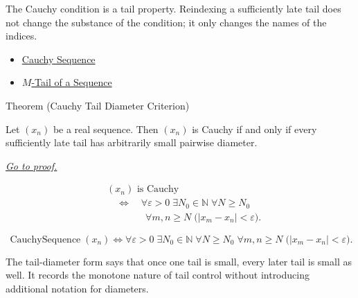 \begin{remark*}[Interpretation]
The Cauchy condition is a tail property. Reindexing a sufficiently late tail
does not change the substance of the condition; it only changes the names of
the indices.
\end{remark*}

\begin{dependencies}
\begin{itemize}
  \item \hyperref[def:cauchy-sequence]{Cauchy Sequence}
  \item \hyperref[def:m-tail]{$M$-Tail of a Sequence}
\end{itemize}
\end{dependencies}


\begin{theorembox}{Theorem (Cauchy Tail Diameter Criterion)}
\begin{theorem}
\label{thm:cauchy-tail-diameter-criterion}
Let $(x_n)$ be a real sequence. Then $(x_n)$ is Cauchy if and only if
every sufficiently late tail has arbitrarily small pairwise diameter.

\smallskip
\noindent
\hyperref[prf:cauchy-tail-diameter-criterion]{\textit{Go to proof.}}
\end{theorem}
\end{theorembox}

\begin{remark*}
\[
\begin{aligned}
&(x_n)\text{ is Cauchy}\\
&\quad\Longleftrightarrow\quad
\forall \varepsilon>0\;\exists N_0\in\mathbb{N}\;\forall N\ge N_0\\
&\qquad\qquad
\forall m,n\ge N\;\bigl(|x_m-x_n|<\varepsilon\bigr).
\end{aligned}
\]
\end{remark*}

\begin{remark*}
\[
\operatorname{CauchySequence}(x_n)
\Longleftrightarrow
\forall \varepsilon>0\;\exists N_0\in\mathbb{N}\;\forall N\ge N_0\;\forall m,n\ge N
\;\bigl(|x_m-x_n|<\varepsilon\bigr).
\]
\end{remark*}

\begin{remark*}[Interpretation]
The tail-diameter form says that once one tail is small, every later tail is
small as well. It records the monotone nature of tail control without
introducing additional notation for diameters.
\end{remark*}

